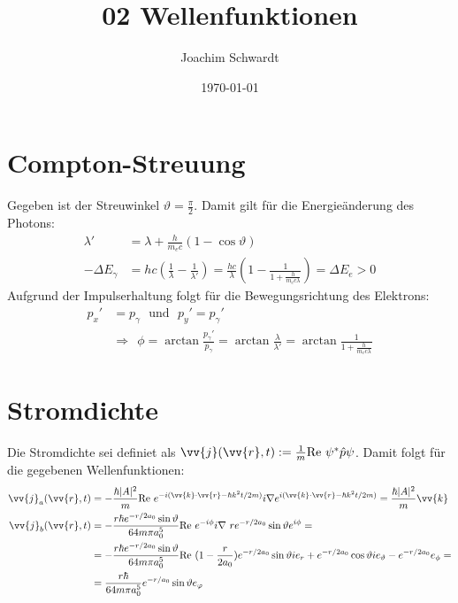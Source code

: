 \documentclass[a4paper,12pt]{article}
\begin{document}
\title{02 Wellenfunktionen}
\author{Joachim Schwardt}
\date{\today}
\maketitle

\section{Compton-Streuung}
Gegeben ist der Streuwinkel $\vartheta = \frac{\pi}{2}$. Damit gilt für die Energieänderung des Photons:
\begin{align*}
\lambda ' &=\lambda +\frac{h}{m_ec}(1-\cos\vartheta)\\
-\Delta E_\gamma&=hc\left(\frac{1}{\lambda}-\frac{1}{\lambda '}\right)=\frac{hc}{\lambda}\left(1-\frac{1}{1+\frac{h}{m_ec\lambda}}\right)=\Delta E_e>0
\end{align*}
Aufgrund der Impulserhaltung folgt für die Bewegungsrichtung des Elektrons:
\begin{align*}
p_x'&=p_\gamma\ \ \ \mathrm{und }\ \ \ p_y'=p_\gamma'\\
&\Rightarrow\ \ \phi=\arctan\frac{p_\gamma'}{p_\gamma}=\arctan\frac{\lambda}{\lambda'}=\arctan\frac{1}{1+\frac{h}{m_ec\lambda}} 
\end{align*}
\section{Stromdichte}
Die Stromdichte sei definiet als $\vv{j}(\vv{r}, t):=\frac{1}{m}\mathrm{Re}\ \psi^\ast \hat{p}\psi$. Damit folgt für die gegebenen Wellenfunktionen:
\begin{align*}
\vv{j}_a(\vv{r}, t)&= -\frac{\hbar |A|^2}{m}\mathrm{Re}\ e^{-i(\vv{k}\cdot\vv{r}-\hbar k^2t/2m)}i\nabla e^{i(\vv{k}\cdot\vv{r}-\hbar k^2t/2m)}=\frac{\hbar |A|^2}{m}\vv{k} \\
\vv{j}_b(\vv{r}, t)&=-\frac{r\hbar e^{-r/2a_0}\sin\vartheta }{64m\pi a_0^5}\mathrm{Re}\ e^{-i\phi}i\nabla\ re^{-r/2a_0}\sin\vartheta e^{i\phi}= \\ 
&= -\frac{r\hbar e^{-r/2a_0}\sin\vartheta }{64m\pi a_0^5} \mathrm{Re}\ (1-\frac{r}{2a_0})e^{-r/2a_0}\sin\vartheta  ie_r+ e^{-r/2a_0}\cos\vartheta ie_\vartheta - e^{-r/2a_0}e_\phi = \\
&=\frac{r\hbar }{64m\pi a_0^5}e^{-r/a_0}\sin\vartheta e_\varphi
\end{align*}
\end{document}
